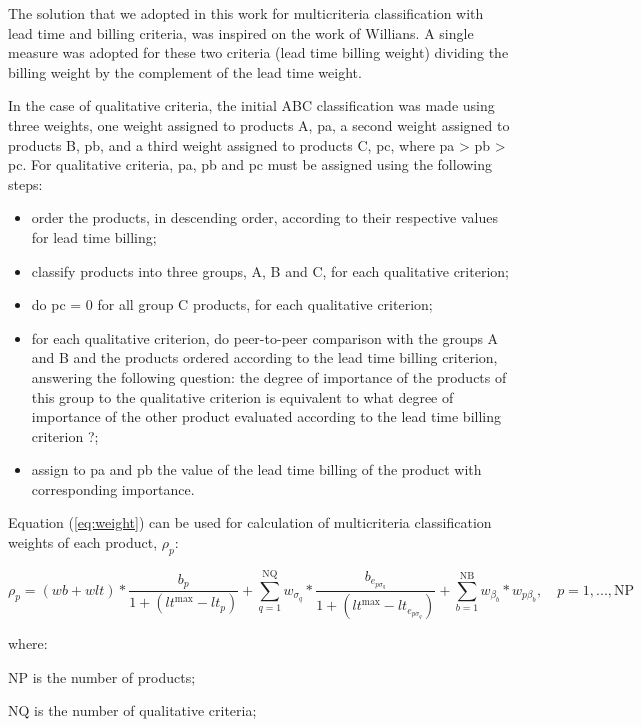 \documentclass[10pt,fleqn,a4paper,twoside]{article}
\begin{document}
	The solution that we adopted in this work for multicriteria classification with lead time and billing criteria, was inspired on the work of Willians. A single measure was adopted for these two criteria (lead time billing  weight) dividing the billing weight by the complement of the lead time weight.

In the case of qualitative criteria, the initial ABC classification was made using three weights, one weight assigned to products A, pa, a second weight assigned to products B, pb, and a third weight assigned to products C, pc, where pa > pb > pc. For qualitative criteria, pa, pb and pc must be assigned using the following steps:
	
\begin{itemize}
\item order the products, in descending order, according to their respective values for lead time billing;
\item classify products into three groups, A, B and C, for each qualitative criterion;
\item do pc = 0 for all group C products, for each qualitative criterion;
\item for each qualitative criterion, do peer-to-peer comparison with the groups A and B and the products ordered according to the lead time billing criterion, answering the following question: the degree of importance of the products of this group to the qualitative criterion is equivalent to what degree of importance of the other product evaluated according to the lead time billing criterion ?;
\item assign to pa and pb the value of the lead time billing of the product with corresponding importance.
\end{itemize}	

Equation (\ref{eq:weight}) can be used for calculation of multicriteria classification weights of each product, $\rho_{p}$:

\begin{equation}
	\label{eq:weight}
	\rho_{p} = (wb + wlt) * \frac{b_p}{1 + (lt^{\max} - lt_p)} + \sum_{q=1}^{\textrm{NQ}}{w_{\sigma_q}*\frac{b_{e_{p\sigma_q}}}{1 + (lt^{\max} - lt_{e_{p\sigma_q}})}} + \sum_{b=1}^{\textrm{NB}}{w_{\beta_b}*w_{p\beta_b}}, \quad p= 1,...,\textrm{NP}
\end{equation}

where:

$\textrm{NP}$ is the number of products;

$\textrm{NQ}$ is the number of qualitative criteria;
\end{document}
